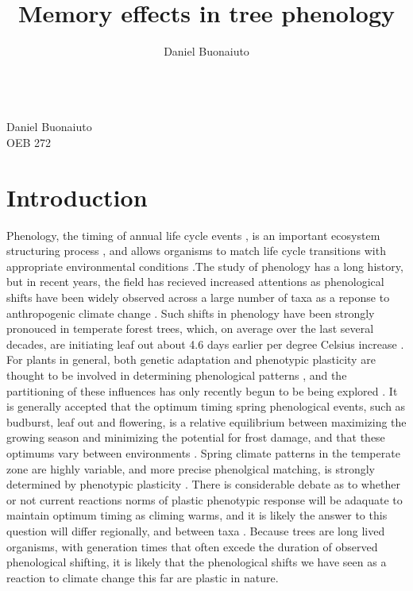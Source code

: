 \documentclass{article}\usepackage[]{graphicx}\usepackage[]{color}
\begin{document}
\title{Memory effects in tree phenology}
\author{Daniel Buonaiuto}
\data{\today}\\
Daniel Buonaiuto\\
OEB 272
\section*{Introduction}
\par Phenology, the timing of annual life cycle events \citep{}, is an important ecosystem structuring process \citep{}, and allows organisms to match life cycle transitions with appropriate environmental conditions \citep{}.The study of phenology has a long history, but in recent years, the field has recieved increased attentions as phenological shifts have been widely observed across a large number of taxa as a reponse to anthropogenic climate change \citep{Menzel2006}. Such shifts in phenology have been strongly pronouced in temperate forest trees, which, on average over the last several decades, are initiating leaf out about 4.6 days earlier per degree Celsius increase \citep{Polgar2014, Wolkovich2012}. For plants in general, both genetic adaptation and phenotypic plasticity are thought to be involved in determining phenological patterns \citep{}, and the partitioning of these influences has only recently begun to be being explored \citep{}. It is generally accepted that the optimum timing spring phenological events, such as budburst, leaf out and flowering, is a relative equilibrium between maximizing the growing season and minimizing the potential for frost damage, and that these optimums vary between environments \citep{Kramer1995}. Spring climate patterns in the temperate zone are highly variable, and more precise phenolgical matching, is strongly determined by phenotypic plasticity \citep{}. There is considerable debate as to whether or not current reactions norms of plastic phenotypic response will be adaquate to maintain optimum timing as climing warms, and it is likely the answer to this question will differ regionally, and between taxa \citep{}. Because trees are long lived organisms, with generation times that often excede the duration of observed phenological shifting, it is likely that the phenological shifts we have seen as a reaction to climate change this far are plastic in nature.
\end{document}
